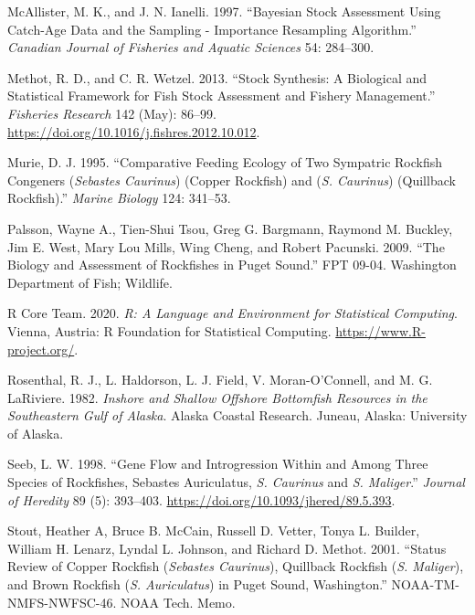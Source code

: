 \documentclass[11pt,
  english,
  a4paper,
]{article}
\begin{document}
\leavevmode\hypertarget{ref-mcallister_bayesian_1997}{}%
McAllister, M. K., and J. N. Ianelli. 1997. ``Bayesian Stock Assessment Using Catch-Age Data and the Sampling - Importance Resampling Algorithm.'' \emph{Canadian Journal of Fisheries and Aquatic Sciences} 54: 284--300.

\leavevmode\hypertarget{ref-methot_stock_2013}{}%
Methot, R. D., and C. R. Wetzel. 2013. ``Stock Synthesis: A Biological and Statistical Framework for Fish Stock Assessment and Fishery Management.'' \emph{Fisheries Research} 142 (May): 86--99. \url{https://doi.org/10.1016/j.fishres.2012.10.012}.

\leavevmode\hypertarget{ref-Murie_diet_1995}{}%
Murie, D. J. 1995. ``Comparative Feeding Ecology of Two Sympatric Rockfish Congeners (\emph{Sebastes Caurinus}) (Copper Rockfish) and (\emph{S. Caurinus}) (Quillback Rockfish).'' \emph{Marine Biology} 124: 341--53.

\leavevmode\hypertarget{ref-Palssonetal_2009}{}%
Palsson, Wayne A., Tien-Shui Tsou, Greg G. Bargmann, Raymond M. Buckley, Jim E. West, Mary Lou Mills, Wing Cheng, and Robert Pacunski. 2009. ``The Biology and Assessment of Rockfishes in Puget Sound.'' FPT 09-04. Washington Department of Fish; Wildlife.

\leavevmode\hypertarget{ref-R_2020}{}%
R Core Team. 2020. \emph{R: A Language and Environment for Statistical Computing}. Vienna, Austria: R Foundation for Statistical Computing. \url{https://www.R-project.org/}.

\leavevmode\hypertarget{ref-Rosenthaletal_maturity_1982}{}%
Rosenthal, R. J., L. Haldorson, L. J. Field, V. Moran-O'Connell, and M. G. LaRiviere. 1982. \emph{Inshore and Shallow Offshore Bottomfish Resources in the Southeastern Gulf of Alaska}. Alaska Coastal Research. Juneau, Alaska: University of Alaska.

\leavevmode\hypertarget{ref-seeb_gene_1998}{}%
Seeb, L. W. 1998. ``Gene Flow and Introgression Within and Among Three Species of Rockfishes, Sebastes Auriculatus, \emph{S. Caurinus} and \emph{S. Maliger}.'' \emph{Journal of Heredity} 89 (5): 393--403. \url{https://doi.org/10.1093/jhered/89.5.393}.

\leavevmode\hypertarget{ref-Stoutetal_DPS_2001}{}%
Stout, Heather A, Bruce B. McCain, Russell D. Vetter, Tonya L. Builder, William H. Lenarz, Lyndal L. Johnson, and Richard D. Methot. 2001. ``Status Review of Copper Rockfish (\emph{Sebastes Caurinus}), Quillback Rockfish (\emph{S. Maliger}), and Brown Rockfish (\emph{S. Auriculatus}) in Puget Sound, Washington.'' NOAA-TM-NMFS-NWFSC-46. NOAA Tech. Memo.
\end{document}
